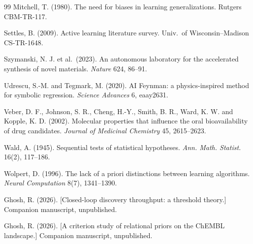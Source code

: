 \documentclass[11pt]{article}
\begin{document}
\begin{thebibliography}{99}
 Mitchell, T. (1980). The need for biases in learning
generalizations. Rutgers CBM-TR-117.

 Settles, B. (2009). Active learning literature survey.
Univ.\ of Wisconsin--Madison CS-TR-1648.

 Szymanski, N. J. et al.\ (2023). An autonomous
laboratory for the accelerated synthesis of novel materials. \emph{Nature}
624, 86--91.

 Udrescu, S.-M. and Tegmark, M. (2020). AI Feynman: a
physics-inspired method for symbolic regression. \emph{Science Advances} 6,
eaay2631.

 Veber, D. F., Johnson, S. R., Cheng, H.-Y., Smith, B. R.,
Ward, K. W. and Kopple, K. D. (2002). Molecular properties that influence
the oral bioavailability of drug candidates. \emph{Journal of Medicinal
Chemistry} 45, 2615--2623.

 Wald, A. (1945). Sequential tests of statistical hypotheses.
\emph{Ann. Math. Statist.} 16(2), 117--186.

 Wolpert, D. (1996). The lack of a priori distinctions
between learning algorithms. \emph{Neural Computation} 8(7), 1341--1390.

 Ghosh, R. (2026). [Closed-loop discovery
throughput: a threshold theory.] Companion manuscript, unpublished.

 Ghosh, R. (2026). [A criterion study of relational
priors on the ChEMBL landscape.] Companion manuscript, unpublished.

\end{thebibliography}
\end{document}

